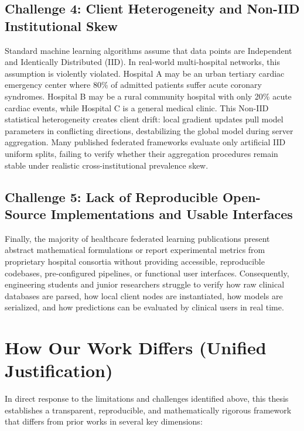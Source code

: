 \documentclass[12pt,a4paper,oneside]{report}
\begin{document}
\subsection{Challenge 4: Client Heterogeneity and Non-IID Institutional Skew}
Standard machine learning algorithms assume that data points are Independent and Identically Distributed (IID). In real-world multi-hospital networks, this assumption is violently violated. Hospital A may be an urban tertiary cardiac emergency center where 80\% of admitted patients suffer acute coronary syndromes. Hospital B may be a rural community hospital with only 20\% acute cardiac events, while Hospital C is a general medical clinic. This Non-IID statistical heterogeneity creates client drift: local gradient updates pull model parameters in conflicting directions, destabilizing the global model during server aggregation. Many published federated frameworks evaluate only artificial IID uniform splits, failing to verify whether their aggregation procedures remain stable under realistic cross-institutional prevalence skew.

\subsection{Challenge 5: Lack of Reproducible Open-Source Implementations and Usable Interfaces}
Finally, the majority of healthcare federated learning publications present abstract mathematical formulations or report experimental metrics from proprietary hospital consortia without providing accessible, reproducible codebases, pre-configured pipelines, or functional user interfaces. Consequently, engineering students and junior researchers struggle to verify how raw clinical databases are parsed, how local client nodes are instantiated, how models are serialized, and how predictions can be evaluated by clinical users in real time.

\section{How Our Work Differs (Unified Justification)}
\label{sec:how_work_differs}

In direct response to the limitations and challenges identified above, this thesis establishes a transparent, reproducible, and mathematically rigorous framework that differs from prior works in several key dimensions:
\end{document}
